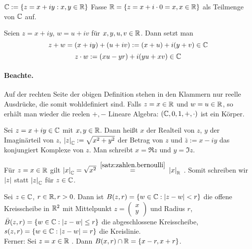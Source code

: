 \documentclass[12pt]{scrreprt}
\begin{document}
\begin{dfn*}
$\mathbb{C} := \{z=x+iy : x,y \in \mathbb{R}\}$
Fasse $\mathbb{R} = \{z=x+i\cdot 0=x, x\in\mathbb{R}\}$ als Teilmenge von $\mathbb{C}$ auf.
\end{dfn*}

Seien $z=x+iy$, $w=u+iv$ für $x,y,u,v \in \mathbb{R}$.
Dann setzt man
$$ z+w = (x+iy) + (u+iv) := (x+u) + i(y+v) \in \mathbb{C}$$
$$ z\cdot w := (xu-yr) + i(yu+xv) \in \mathbb{C}$$
\paragraph{Beachte.} Auf der rechten Seite der obigen Definition stehen in den Klammern nur reelle Ausdrücke, die somit wohldefiniert sind.
Falls $z=x \in \mathbb{R}$ und $w=u \in \mathbb{R}$, so erhält man wieder die reelen $+, -$
Lineare Algebra: $(\mathbb{C},0,1,+,\cdot)$ ist ein Körper.

\begin{dfn}\label{dfn:zahlen.komplex}
Sei $z=x+iy \in \mathbb{C} $ mit $x,y \in \mathbb{R}$. Dann heißt $x$ der Realteil von $z$, $y$ der Imaginärteil von $z$, 
$\left\lvert z\right\lvert_{\mathbb{C}} := \sqrt{x^2+y^2}$ der Betrag von $z$ und $\bar{z}:=x-iy$ das konjungiert Komplexe von $z$.
Man schreibt $x = \Re{z}$ und $ y = \Im{z}$.

\begin{bem*}
Für $z = x \in \mathbb{R}$ gilt $\abs{x}_\set{C} = \sqrt{x^2} \wegen{=}{\ref{satz:zahlen.bernoulli}} \abs{x}_\set{R}$ . 
Somit schreiben wir $\left\lvert z\right\lvert$ statt $\left\lvert z\right\lvert_{\mathbb{C}}$ für $z \in \mathbb{C}$.
\end{bem*}
Sei $z \in \mathbb{C}$, $r \in \mathbb{R}, r>0$. Dann ist $B(z,r) = \{w \in \mathbb{C}:\left\lvert z-w\right\lvert<r\}$
die offene Kreisscheibe in $\mathbb{R}^2$ mit Mittelpunkt $z = \begin{pmatrix} x \\ y \end{pmatrix}$ und Radius
$r$, $\bar{B}(z,r)   = \{w \in \mathbb{C}:\left\lvert z-w\right\lvert\le r\}$ die abgeschlossene Kreisscheibe,
$s(z,r)   = \{w \in \mathbb{C}:\left\lvert z-w\right\lvert= r\}$ die Kreislinie.\\
Ferner: Sei $z = x \in \mathbb{R}$	. Dann $ B(x,r) \cap \mathbb{R} = \{x-r, x+r\}$.
\end{dfn}
\end{document}
